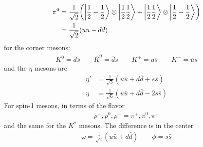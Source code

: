 \documentclass[../main.tex]{subfiles}
\begin{document}
\begin{itemize}
\begin{align*}
        \pi^0 &= \frac{1}{\sqrt{2}}
            \qt(\ket{\ohf -\ohf} \otimes \ket{\ohf \ohf} + \ket{\ohf \ohf} \otimes \ket{\ohf -\ohf})  \\
        &= \frac{1}{\sqrt{2}} (u \bar u - d \bar d)
    \end{align*}
    for the corner mesons:
    \begin{align*}
        K^0 = d \bar s \qquad \bar K^0 = \bar d s \qquad K^+ = u \bar s \qquad K^- = \bar u s
    \end{align*}
    and the $\eta$ mesons are
    \begin{align*}
        \eta' &= \frac{1}{\sqrt{3}} (u \bar u + d \bar d + s \bar s) \\
        \eta &= \frac{1}{\sqrt{6}} (u \bar u + d \bar d - 2s \bar s)
    \end{align*}
    For spin-1 mesons, in terms of the flavor
    \begin{align*}
        \rho^+, \rho^0, \rho^- = \pi^+, \pi^0, \pi^- 
    \end{align*}
    and the same for the $K^*$ mesons. The difference is in the center
    \begin{align*}
        \omega = \frac{1}{\sqrt{2}} (u \bar u + d \bar d) \qquad \phi = s \bar s
    \end{align*}
\end{itemize}

\newpage
{}
\end{document}
